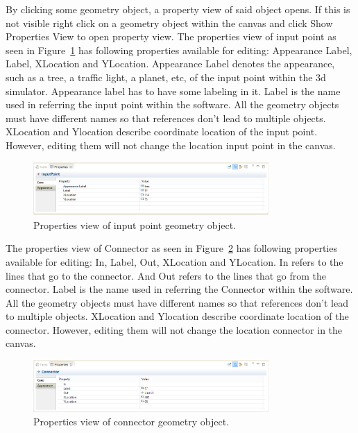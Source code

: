 By clicking some geometry object, a property view of said object opens. If this is not visible right click on a geometry object within the canvas and click Show Properties View to open property view.
The properties view of input point as seen in Figure~\ref{fig:ge-prop-input} has following properties available for editing: Appearance Label, Label, XLocation and YLocation. Appearance Label denotes the appearance, such as a tree, a traffic light, a planet, etc, of the input point within the 3d simulator. Appearance label has to have some labeling in it. Label is the name used in referring the input point within the software. All the geometry objects must have different names so that references don't lead to multiple objects. XLocation and Ylocation describe coordinate location of the input point. However, editing them will not change the location input point in the canvas.

\begin{figure}[htp]
\begin{center}
  \includegraphics[width=0.8\textwidth]{image/ge-prop-input.png}
  \caption{Properties view of input point geometry object.}
  \label{fig:ge-prop-input}
\end{center}
\end{figure}

The properties view of Connector as seen in Figure~\ref{fig:ge-prop-conn} has following properties available for editing: In, Label, Out, XLocation and YLocation. In refers to the lines that go to the connector. And Out refers to the lines that go from the connector. Label is the name used in referring the Connector within the software. All the geometry objects must have different names so that references don't lead to multiple objects. XLocation and Ylocation describe coordinate location of the connector. However, editing them will not change the location connector in the canvas.

\begin{figure}[htp]
\begin{center}
  \includegraphics[width=0.8\textwidth]{image/ge-prop-conn.png}
  \caption{Properties view of connector geometry object.}
  \label{fig:ge-prop-conn}
\end{center}
\end{figure}

